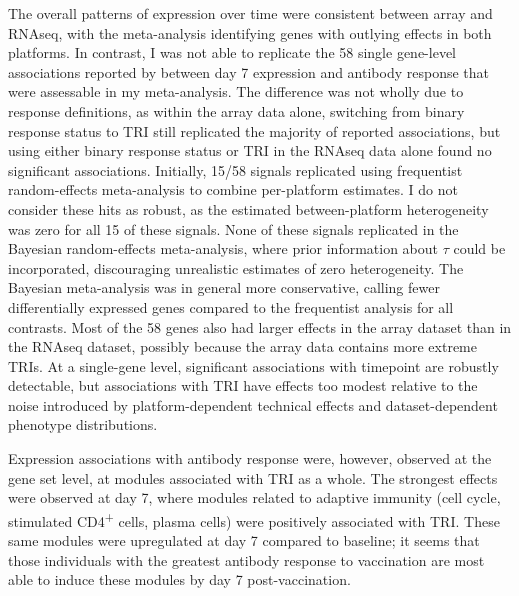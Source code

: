 The overall patterns of expression over time were consistent between array and \gls{RNAseq}, with the meta-analysis identifying genes with outlying effects in both platforms.
In contrast, I was not able to replicate the 58 single gene-level associations reported by \textcite{sobolev2016AdjuvantedInfluenzaH1N1Vaccination} between day 7 expression and antibody response that were assessable in my meta-analysis.
The difference was not wholly due to response definitions, as within the array data alone, switching from binary response status to \gls{TRI} still replicated the majority of reported associations,
but using either binary response status or \gls{TRI} in the \gls{RNAseq} data alone found no significant associations.
Initially, 15/58 signals replicated using frequentist random-effects meta-analysis to combine per-platform estimates.
I do not consider these hits as robust, as the estimated between-platform heterogeneity was zero for all 15 of these signals.
None of these signals replicated in the Bayesian random-effects meta-analysis,
where prior information about $\tau$ could be incorporated, discouraging unrealistic estimates of zero heterogeneity.
The Bayesian meta-analysis was in general more conservative, calling fewer differentially expressed genes compared to the frequentist analysis for all contrasts.
Most of the 58 genes also had larger effects in the array dataset than in the \gls{RNAseq} dataset, possibly because the array data contains more extreme \glspl{TRI}.
At a single-gene level, significant associations with timepoint are robustly detectable, 
but associations with \gls{TRI} have effects too modest relative to the noise introduced by platform-dependent technical effects and dataset-dependent phenotype distributions.
%

Expression associations with antibody response were, however, observed at the gene set level, at modules associated with \gls{TRI} as a whole.
The strongest effects were observed at day 7, where modules related to adaptive immunity (cell cycle, stimulated CD4\textsuperscript{+} cells, plasma cells) were positively associated with \gls{TRI}.
These same modules were upregulated at day 7 compared to baseline; it seems that those individuals with the greatest antibody response to vaccination are most able to induce these modules by day 7 post-vaccination.

